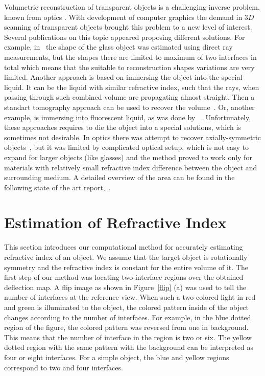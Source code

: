 \documentclass[10pt,twocolumn,letterpaper]{article}
\begin{document}
Volumetric reconstruction of transparent objects is a challenging inverse problem, 
known from optics \cite{vest1985}. With development of computer graphics the demand in 
$3D$ scanning of transparent objects brought this problem to a new level of interest.
Several publications on this topic appeared proposing different solutions. For example, in~\cite{Kutulakos:2005:ICCV} the shape of the glass object was estimated using direct ray measurements, but the shapes there are limited to maximum of two interfaces in total which means that the suitable to reconstruction shapes variations are very limited. Another approach is based on immersing the object into the special liquid. It can be the liquid with similar refractive index, such that the rays, when passing through such combined volume are propagating almost straight. Then a standart tomography approach can be used to recover the volume~\cite{Trifonov:2006:TRT}. Or, another example, is immersing into fluorescent liquid, as was done by ~\cite{Hullin08:FIRS}. Unfortunately, these approaches requires to die the object into a special solutions, which is sometimes not desirable. In optics there was attempt to recover axially-symmetric objects~\cite{Maruyama:77}, but it was limited by complicated optical setup, which is not easy to expand for larger objects (like glasses) and the method proved to work only for materials with relatively small refractive index difference between the object and surrounding medium. A detailed overview of the area can be found in the following state of the art report,~\cite{Ihrke10:TSOR}.

\section{Estimation of Refractive Index}

This section introduces our computational method for accurately estimating refractive index of an object. We assume that the target object is rotationally symmetry and the refractive index is constant for the entire volume of it. The first step of our method was locating two-interface regions over the obtained deflection map. A flip image as shown in Figure~\ref{flip} (a) was used to tell the number of interfaces at the reference view. When such a two-colored light in red and green is illuminated to the object, the colored pattern inside of the object changes according to the number of interfaces. For example, in the blue dotted region of the figure, the colored pattern was reversed from one in background. This means that the number of interface in the region is two or six. The yellow dotted region with the same pattern with the background can be interpreted as four or eight interfaces. For a simple object, the blue and yellow regions correspond to two and four interfaces.
\end{document}
